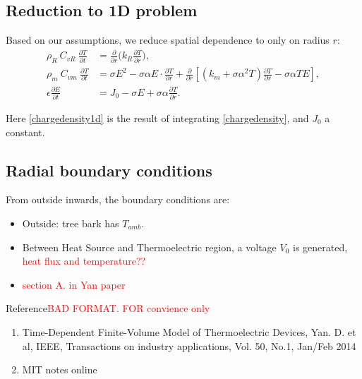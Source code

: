 \documentclass[12pt]{article}
\begin{document}
\subsection{Reduction to 1D problem}
Based on our assumptions, we reduce spatial dependence to only on radius $r$: 
\begin{align}
\rho_R\ C_{vR}\ \frac{\partial T}{\partial t}&=\frac{\partial }{\partial r}\big(k_R\frac{\partial T}{\partial r}\big),\label{heat1d}\\
\rho_{m}\ C_{vm}\ \frac{\partial T}{\partial t}&=\sigma E^2-\sigma \alpha E\cdot \frac{\partial T}{\partial r}+\frac{\partial }{\partial r}[(k_m+\sigma\alpha^2T)\frac{\partial T}{\partial r}-\sigma\alpha T E],\label{elec1d}\\
\epsilon\frac{\partial E}{\partial t}&=J_0-\sigma E+\sigma\alpha\frac{\partial T}{\partial r}.\label{chargedensity1d}
\end{align}

Here \eqref{chargedensity1d} is the result of integrating \eqref{chargedensity}, and $J_0$ a constant. 

\subsection{Radial boundary conditions}

From outside inwards, the boundary conditions are:
\begin{itemize}
\item Outside: tree bark has $T_{amb}$.
\item Between Heat Source and Thermoelectric region, a voltage $V_0$ is generated, \textcolor{red}{heat flux and temperature??}
\item \textcolor{red}{section A. in Yan paper}

\end{itemize}

\newpage
Reference\textcolor{red}{BAD FORMAT. FOR convience only}
\begin{enumerate}
\item Time-Dependent Finite-Volume Model of Thermoelectric Devices, Yan. D. et al, IEEE, Transactions on industry applications, Vol. 50, No.1, Jan/Feb 2014\label{thermoelectric}

\item MIT notes online\label{mit}



\end{enumerate}
\end{document}
